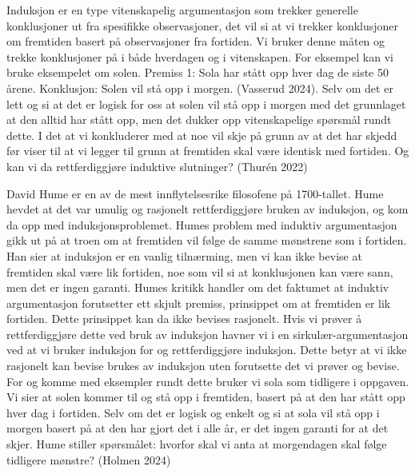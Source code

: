 \documentclass[
  letterpaper,
  DIV=11,
  numbers=noendperiod]{scrreprt}
\begin{document}
Induksjon er en type vitenskapelig argumentasjon som trekker generelle
konklusjoner ut fra spesifikke observasjoner, det vil si at vi trekker
konklusjoner om fremtiden basert på observasjoner fra fortiden. Vi
bruker denne måten og trekke konklusjoner på i både hverdagen og i
vitenskapen. For eksempel kan vi bruke eksempelet om solen. Premiss 1:
Sola har stått opp hver dag de siste 50 årene. Konklusjon: Solen vil stå
opp i morgen. (Vasserud 2024). Selv om det er lett og si at det er
logisk for oss at solen vil stå opp i morgen med det grunnlaget at den
alltid har stått opp, men det dukker opp vitenskapelige spørsmål rundt
dette. I det at vi konkluderer med at noe vil skje på grunn av at det
har skjedd før viser til at vi legger til grunn at fremtiden skal være
identisk med fortiden. Og kan vi da rettferdiggjøre induktive
slutninger? (Thurén 2022)

David Hume er en av de mest innflytelsesrike filosofene på 1700-tallet.
Hume hevdet at det var umulig og rasjonelt rettferdiggjøre bruken av
induksjon, og kom da opp med induksjonsproblemet. Humes problem med
induktiv argumentasjon gikk ut på at troen om at fremtiden vil følge de
samme mønstrene som i fortiden. Han sier at induksjon er en vanlig
tilnærming, men vi kan ikke bevise at fremtiden skal være lik fortiden,
noe som vil si at konklusjonen kan være sann, men det er ingen garanti.
Humes kritikk handler om det faktumet at induktiv argumentasjon
forutsetter ett skjult premiss, prinsippet om at fremtiden er lik
fortiden. Dette prinsippet kan da ikke bevises rasjonelt. Hvis vi prøver
å rettferdiggjøre dette ved bruk av induksjon havner vi i en
sirkulær-argumentasjon ved at vi bruker induksjon for og rettferdiggjøre
induksjon. Dette betyr at vi ikke rasjonelt kan bevise brukes av
induksjon uten forutsette det vi prøver og bevise. For og komme med
eksempler rundt dette bruker vi sola som tidligere i oppgaven. Vi sier
at solen kommer til og stå opp i fremtiden, basert på at den har stått
opp hver dag i fortiden. Selv om det er logisk og enkelt og si at sola
vil stå opp i morgen basert på at den har gjort det i alle år, er det
ingen garanti for at det skjer. Hume stiller spørsmålet: hvorfor skal vi
anta at morgendagen skal følge tidligere mønstre? (Holmen 2024)
\end{document}
